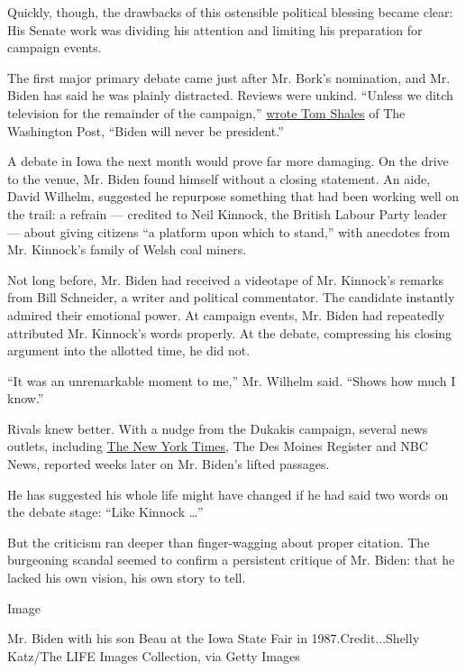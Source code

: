 Quickly, though, the drawbacks of this ostensible political blessing
became clear: His Senate work was dividing his attention and limiting
his preparation for campaign events.

The first major primary debate came just after Mr. Bork's nomination,
and Mr. Biden has said he was plainly distracted. Reviews were unkind.
``Unless we ditch television for the remainder of the campaign,''
\href{https://www.washingtonpost.com/archive/lifestyle/1987/07/03/the-diverting-democrats/7d31e08c-fcd3-4cd7-8006-f0ab5b135ea5/?utm_term=.ff508010ed4e}{wrote
Tom Shales} of The Washington Post, ``Biden will never be president.''

A debate in Iowa the next month would prove far more damaging. On the
drive to the venue, Mr. Biden found himself without a closing statement.
An aide, David Wilhelm, suggested he repurpose something that had been
working well on the trail: a refrain --- credited to Neil Kinnock, the
British Labour Party leader --- about giving citizens ``a platform upon
which to stand,'' with anecdotes from Mr. Kinnock's family of Welsh coal
miners.

Not long before, Mr. Biden had received a videotape of Mr. Kinnock's
remarks from Bill Schneider, a writer and political commentator. The
candidate instantly admired their emotional power. At campaign events,
Mr. Biden had repeatedly attributed Mr. Kinnock's words properly. At the
debate, compressing his closing argument into the allotted time, he did
not.

``It was an unremarkable moment to me,'' Mr. Wilhelm said. ``Shows how
much I know.''

Rivals knew better. With a nudge from the Dukakis campaign, several news
outlets, including
\href{https://www.nytimes.com/1987/09/12/us/biden-s-debate-finale-an-echo-from-abroad.html}{The
New York Times}, The Des Moines Register and NBC News, reported weeks
later on Mr. Biden's lifted passages.

He has suggested his whole life might have changed if he had said two
words on the debate stage: ``Like Kinnock \ldots{}''

But the criticism ran deeper than finger-wagging about proper citation.
The burgeoning scandal seemed to confirm a persistent critique of Mr.
Biden: that he lacked his own vision, his own story to tell.

Image

Mr. Biden with his son Beau at the Iowa State Fair in
1987.Credit...Shelly Katz/The LIFE Images Collection, via Getty Images

